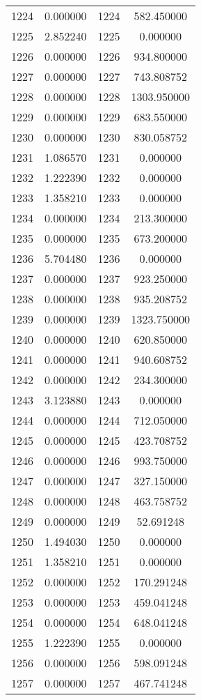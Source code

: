 \documentclass[12pt]{article}
\begin{document}
\begin{longtable}{@{}cccc@{}}
1224 & 0.000000 & 1224 & 582.450000 \\
1225 & 2.852240 & 1225 & 0.000000 \\
1226 & 0.000000 & 1226 & 934.800000 \\
1227 & 0.000000 & 1227 & 743.808752 \\
1228 & 0.000000 & 1228 & 1303.950000 \\
1229 & 0.000000 & 1229 & 683.550000 \\
1230 & 0.000000 & 1230 & 830.058752 \\
1231 & 1.086570 & 1231 & 0.000000 \\
1232 & 1.222390 & 1232 & 0.000000 \\
1233 & 1.358210 & 1233 & 0.000000 \\
1234 & 0.000000 & 1234 & 213.300000 \\
1235 & 0.000000 & 1235 & 673.200000 \\
1236 & 5.704480 & 1236 & 0.000000 \\
1237 & 0.000000 & 1237 & 923.250000 \\
1238 & 0.000000 & 1238 & 935.208752 \\
1239 & 0.000000 & 1239 & 1323.750000 \\
1240 & 0.000000 & 1240 & 620.850000 \\
1241 & 0.000000 & 1241 & 940.608752 \\
1242 & 0.000000 & 1242 & 234.300000 \\
1243 & 3.123880 & 1243 & 0.000000 \\
1244 & 0.000000 & 1244 & 712.050000 \\
1245 & 0.000000 & 1245 & 423.708752 \\
1246 & 0.000000 & 1246 & 993.750000 \\
1247 & 0.000000 & 1247 & 327.150000 \\
1248 & 0.000000 & 1248 & 463.758752 \\
1249 & 0.000000 & 1249 & 52.691248 \\
1250 & 1.494030 & 1250 & 0.000000 \\
1251 & 1.358210 & 1251 & 0.000000 \\
1252 & 0.000000 & 1252 & 170.291248 \\
1253 & 0.000000 & 1253 & 459.041248 \\
1254 & 0.000000 & 1254 & 648.041248 \\
1255 & 1.222390 & 1255 & 0.000000 \\
1256 & 0.000000 & 1256 & 598.091248 \\
1257 & 0.000000 & 1257 & 467.741248 \\

\end{longtable}
\end{document}
